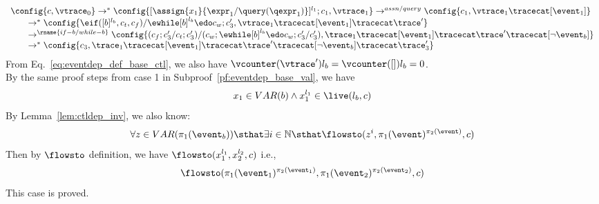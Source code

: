 \begin{subproof}
\begin{equation}
\label{eq:ctldep_inv2}
\begin{array}{l}   
  \config{{c}, \vtrace_0} \rightarrow^{*} 
  \config{[\assign{{x}_1}{\expr_1 / \query(\qexpr_1)}]^{l_1} ; {c}_1, \vtrace_1}  
  \rightarrow^{assn/query}
   \config{c_1, \vtrace_1 \tracecat [\event_1]} 
   \\
    \qquad \rightarrow^{*} 
    \config{\eif ([b]^{l_b}, c_t, c_f) / \ewhile [b]^{l_b} \edo c_w;{c}_3', 
    \vtrace_1 \tracecat [\event_1] \tracecat \trace'} 
    \\
    \qquad 
     \rightarrow^{\rname{if-b / while-b}} 
    \config{(c_f;c_3' / c_t;c_3') /(c_w; \ewhile [b]^{l_b} \edo c_w;{c}_3' / c_3'), 
    \trace_1 \tracecat [\event_1]  \tracecat \trace' \tracecat [\neg \event_b]} 
    \\
    \qquad   \rightarrow^{*} 
    \config{c_3, 
    \trace_1 \tracecat [\event_1]  \tracecat \trace' \tracecat [\neg \event_b] \tracecat  \trace_3'}
  \end{array}
\end{equation}
%
From Eq.~\ref{eq:eventdep_def_base_ctl}, we also have
  $\vcounter(\vtrace') l_b = \vcounter( [] ) l_b = 0$.
\\
%
%
By the same proof steps from case 1 in Subproof~\ref{pf:eventdep_base_val}, we have
\[
  x_1 \in VAR(b)  \land x_1^{l_1} \in \live(l_b, c)
\]
%
By Lemma~\ref{lem:ctldep_inv}, we also know:
\[
  \forall z \in VAR(\pi_1(\event_b)) \sthat  \exists i \in \mathbb{N} \sthat 
\flowsto(z^i, \pi_1(\event)^{\pi_2(\event)}, c)
\]
%
Then by $\flowsto$ definition, we have $\flowsto(x_1^{l_1}, {x}_2^{l_2}, c)$
%
i.e.,
%
\[
\flowsto(\pi_1(\event_1)^{\pi_2(\event_1)}, \pi_1(\event_2)^{\pi_2(\event_2)}, c)
 \]
%
This case is proved.
\end{subproof}